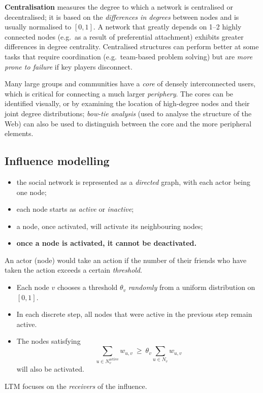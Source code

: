 \documentclass[11pt,a4paper]{article}
\theoremstyle{definition}
\begin{document}
\begin{defbox}
\textbf{Centralisation} measures the degree to which a network is centralised or decentralised; it is
based on the \emph{differences in degrees} between nodes and is usually normalised to $[0,1]$. A
network that greatly depends on 1--2 highly connected nodes (e.g.\ as a result of preferential
attachment) exhibits greater differences in degree centrality. Centralised structures can perform
better at some tasks that require coordination (e.g.\ team-based problem solving) but are
\emph{more prone to failure} if key players disconnect.

Many large groups and communities have a \emph{core} of densely interconnected users, which is
critical for connecting a much larger \emph{periphery}. The cores can be identified visually, or by
examining the location of high-degree nodes and their joint degree distributions;
\emph{bow-tie analysis} (used to analyse the structure of the Web) can also be used to distinguish
between the core and the more peripheral elements.
\end{defbox}

\subsection{Influence modelling}

\begin{defbox}
\begin{itemize}
\item the social network is represented as a \emph{directed} graph, with each actor being one node;
\item each node starts as \emph{active} or \emph{inactive};
\item a node, once activated, will activate its neighbouring nodes;
\item \textbf{once a node is activated, it cannot be deactivated.}
\end{itemize}
\end{defbox}

\begin{defbox}
An actor (node) would take an action if the number of their friends who have taken the action exceeds
a certain \emph{threshold}.
\begin{itemize}
\item Each node $v$ chooses a threshold $\theta_v$ \emph{randomly} from a uniform distribution on
      $[0,1]$.
\item In each discrete step, all nodes that were active in the previous step remain active.
\item The nodes satisfying
      \[ \sum_{u\in N_v^{\text{active}}} w_{u,v}\ \ge\ \theta_v
         \sum_{u\in N_v} w_{u,v} \]
      will also be activated.
\end{itemize}
LTM focuses on the \emph{receivers} of the influence.
\end{defbox}
\end{document}
